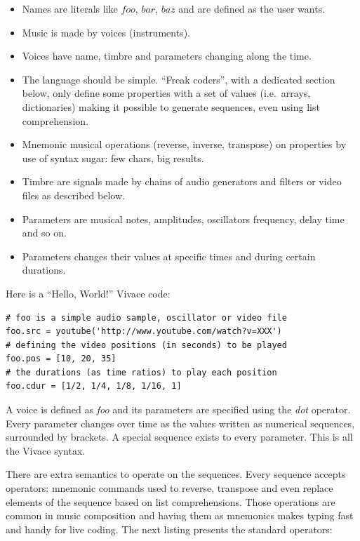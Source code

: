 \documentclass[letterpaper, 12pt]{article}
\begin{document}
\begin{itemize}
  
\item Names are literals like $foo$, $bar$, $baz$ and are defined as
  the user wants.
\item Music is made by voices (instruments).
\item Voices have name, timbre and parameters changing along the time.
\item The language should be simple. ``Freak coders'', with a
  dedicated section below, only define some properties with a set of
  values (i.e.\ arrays, dictionaries) making it possible to generate
  sequences, even using list comprehension.
\item Mnemonic musical operations (reverse, inverse, transpose) on
  properties by use of syntax sugar: few chars, big results.
\item Timbre are signals made by chains of audio generators and
  filters or video files as described below.
\item Parameters are musical notes, amplitudes, oscillators frequency,
  delay time and so on.
\item Parameters changes their values at specific times and during
  certain durations.

\end{itemize}

Here is a ``Hello, World!'' Vivace code:

\begin{Verbatim}[fontfamily=courier, xleftmargin=\parindent]
# foo is a simple audio sample, oscillator or video file
foo.src = youtube('http://www.youtube.com/watch?v=XXX')
# defining the video positions (in seconds) to be played
foo.pos = [10, 20, 35]
# the durations (as time ratios) to play each position
foo.cdur = [1/2, 1/4, 1/8, 1/16, 1]
\end{Verbatim}

A voice is defined as \textit{foo} and its parameters are specified
using the \textit{dot} operator. Every parameter changes over time as
the values written as numerical sequences, surrounded by brackets. A
special sequence exists to every parameter.  This is all the Vivace
syntax.

There are extra semantics to operate on the sequences. Every sequence
accepts operators: mnemonic commands used to reverse, transpose and
even replace elements of the sequence based on list
comprehensions. Those operations are common in music composition and
having them as mnemonics makes typing fast and handy for live
coding. The next listing presents the standard operators:
\end{document}
